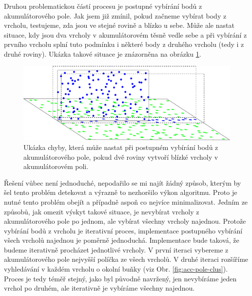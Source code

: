 \documentclass[11pt,twoside,a4paper]{book}
\begin{document}
Druhou problematickou částí procesu je postupné vybírání bodů z akumulátorového pole. Jak jsem již zmínil, pokud začneme vybírat body z vrcholu, testujeme, zda jsou ve stejné rovině a blízko u sebe. Může ale nastat situace, kdy jsou dva vrcholy v akumulátorovém těsně vedle sebe a při vybírání z prvního vrcholu splní tuto podmínku i některé body z druhého vrcholu (tedy i z druhé roviny). Ukázka takové situace je znázorněna na obrázku \ref{fig:chyba-clustering}.

\begin{figure}[ht]
\begin{center}
\includegraphics[width=\textwidth]{figures/chyba-clustering}
\caption{Ukázka chyby, která může nastat při postupném vybírání bodů z akumulátorového pole, pokud dvě roviny vytvoří blízké vrcholy v akumulátorovém poli.}
\label{fig:chyba-clustering}
\end{center}
\end{figure}

Řešení vůbec není jednoduché, nepodařilo se mi najít žádný způsob, kterým by šel tento problém detekovat a výrazně to nezhoršilo výkon algoritmu. Proto je nutné tento problém obejít a případně aspoň co nejvíce minimalizovat. Jedním ze způsobů, jak omezit výskyt takové situace, je nevybírat vrcholy z akumulátorového pole po jednom, ale vybírat všechny vrcholy najednou. Protože vybírání bodů z vrcholu je iterativní proces, implementace postupného vybírání všech vrcholů najednou je poměrně jednoduchá. Implementace bude taková, že budeme iterativně procházet jednotlivé vrcholy. V první iteraci vybereme z akumulátorového pole nejvyšší políčka ze všech vrcholů. V druhé iteraci rozšíříme vyhledávání v každém vrcholu o okolní buňky (viz Obr. \ref{fig:acc-pole-clus}). Proces je tedy téměř stejný, jako byl původně navržený, jen nevybíráme jeden vrchol po druhém, ale iterativně je vybíráme všechny najednou.
\end{document}

